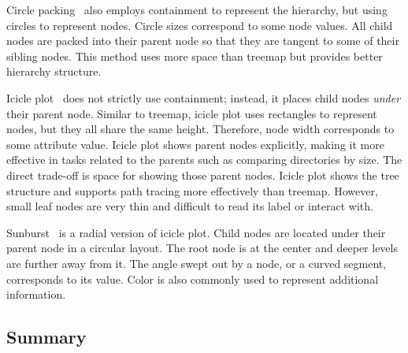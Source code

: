 Circle packing~\cite{Wang2006} also employs containment to represent the hierarchy, but using circles to represent nodes. Circle sizes correspond to some node values. All child nodes are packed into their parent node so that they are tangent to some of their sibling nodes. This method uses more space than treemap but provides better hierarchy structure.

Icicle plot~\cite{Kruskal1983} does not strictly use containment; instead, it places child nodes \emph{under} their parent node. Similar to treemap, icicle plot uses rectangles to represent nodes, but they all share the same height. Therefore, node width corresponds to some attribute value. Icicle plot shows parent nodes explicitly, making it more effective in tasks related to the parents such as comparing directories by size. The direct trade-off is space for showing those parent nodes. Icicle plot shows the tree structure and supports path tracing more effectively than treemap. However, small leaf nodes are very thin and difficult to read its label or interact with.

Sunburst~\cite{Zhang2000} is a radial version of icicle plot. Child nodes are located under their parent node in a circular layout. The root node is at the center and deeper levels are further away from it. The angle swept out by a node, or a curved segment, corresponds to its value. Color is also commonly used to represent additional information.


\subsection{Summary}
